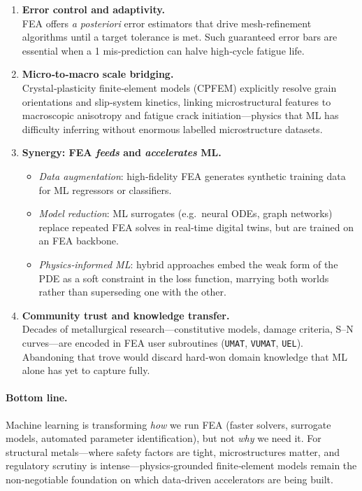 \documentclass[12pt]{article}
\theoremstyle{definition} %
\theoremstyle{plain} %
\begin{document}
\begin{enumerate}
  \item \textbf{Error control and adaptivity.}\\
        FEA offers \emph{a posteriori} error estimators that drive
        mesh-refinement algorithms until a target tolerance is met.
        Such guaranteed error bars are essential when a 1 %
        mis‑prediction can halve high‑cycle fatigue life.

  \item \textbf{Micro‐to‑macro scale bridging.}\\
        Crystal‑plasticity finite‑element models (CPFEM) explicitly
        resolve grain orientations and slip‑system kinetics, linking
        microstructural features to macroscopic anisotropy and fatigue
        crack initiation—physics that ML has difficulty inferring
        without enormous labelled microstructure datasets.

  \item \textbf{Synergy: FEA \emph{feeds} and \emph{accelerates} ML.}\\
        \begin{itemize}
          \item \emph{Data augmentation}: high‑fidelity FEA generates
                synthetic training data for ML regressors or classifiers.
          \item \emph{Model reduction}: ML surrogates (e.g.\ neural ODEs,
                graph networks) replace repeated FEA solves in
                real‑time digital twins, but are trained on an FEA
                backbone.
          \item \emph{Physics‑informed ML}: hybrid approaches embed the
                weak form of the PDE as a soft constraint in the loss
                function, marrying both worlds rather than superseding
                one with the other.
        \end{itemize}

  \item \textbf{Community trust and knowledge transfer.}\\
        Decades of metallurgical research—constitutive models, damage
        criteria, S–N curves—are encoded in FEA user subroutines
        (\texttt{UMAT}, \texttt{VUMAT}, \texttt{UEL}).
        Abandoning that trove would discard hard‑won domain knowledge
        that ML alone has yet to capture fully.
\end{enumerate}

\paragraph{Bottom line.}
Machine learning is transforming \emph{how} we run FEA (faster solvers,
surrogate models, automated parameter identification), but not \emph{why} we
need it.  
For structural metals—where safety factors are tight, microstructures
matter, and regulatory scrutiny is intense—physics‑grounded finite‑element
models remain the non‑negotiable foundation on which data‑driven
accelerators are being built.
\end{document}
